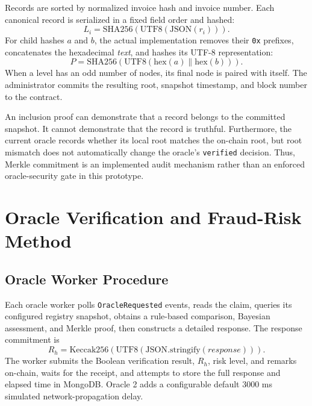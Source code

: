 Records are sorted by normalized invoice hash and invoice number. Each canonical
record is serialized in a fixed field order and hashed:
\begin{equation}
L_i=\mathrm{SHA256}\left(\mathrm{UTF8}(\mathrm{JSON}(r_i))\right).
\label{eq:merkle_leaf}
\end{equation}
For child hashes \(a\) and \(b\), the actual implementation removes their
\texttt{0x} prefixes, concatenates the hexadecimal \emph{text}, and hashes its
UTF-8 representation:
\begin{equation}
P=\mathrm{SHA256}\left(
\mathrm{UTF8}(\mathrm{hex}(a)\parallel\mathrm{hex}(b))
\right).
\label{eq:merkle_parent}
\end{equation}
When a level has an odd number of nodes, its final node is paired with itself.
The administrator commits the resulting root, snapshot timestamp, and block
number to the contract.

An inclusion proof can demonstrate that a record belongs to the committed
snapshot. It cannot demonstrate that the record is truthful. Furthermore, the
current oracle records whether its local root matches the on-chain root, but
root mismatch does not automatically change the oracle's \texttt{verified}
decision. Thus, Merkle commitment is an implemented audit mechanism rather than
an enforced oracle-security gate in this prototype.

\section{Oracle Verification and Fraud-Risk Method}
\label{sec:oracle_fraud_method}

\subsection{Oracle Worker Procedure}

Each oracle worker polls \texttt{OracleRequested} events, reads the claim,
queries its configured registry snapshot, obtains a rule-based comparison,
Bayesian assessment, and Merkle proof, then constructs a detailed response. The
response commitment is
\begin{equation}
R_h=\mathrm{Keccak256}\left(
\mathrm{UTF8}(\mathrm{JSON.stringify}(response))
\right).
\label{eq:oracle_response_hash}
\end{equation}
The worker submits the Boolean verification result, \(R_h\), risk level, and
remarks on-chain, waits for the receipt, and attempts to store the full response
and elapsed time in MongoDB. Oracle 2 adds a configurable default 3000 ms
simulated network-propagation delay.

